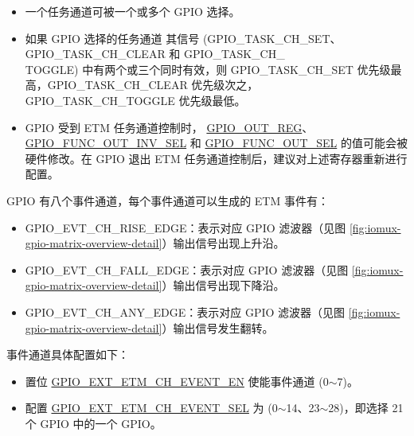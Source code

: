 \documentclass[main\_\_CN.tex]{subfiles}
\begin{document}
\begin{tiplisting}
\vspace{-2em}
\begin{itemize}
\item 一个任务通道可被一个或多个 GPIO 选择。

\item 如果 GPIO 选择的任务通道  其信号 (GPIO\_TASK\_CH\_SET、GPIO\_TASK\_CH\_CLEAR 和 GPIO\_TASK\_CH\_\\TOGGLE) 中有两个或三个同时有效，则 GPIO\_TASK\_CH\_SET 优先级最高，GPIO\_TASK\_CH\_CLEAR 优先级次之，GPIO\_TASK\_CH\_TOGGLE 优先级最低。

\item GPIO 受到 ETM 任务通道控制时， \hyperref[regdesc:GPIOOUTREG]{GPIO\_OUT\_REG}、 \hyperref[fielddesc:GPIOFUNCNOUTINVSEL]{GPIO\_FUNC\_OUT\_INV\_SEL} 和 \hyperref[fielddesc:GPIOFUNCNOUTSEL]{GPIO\_FUNC\_OUT\_SEL} 的值可能会被硬件修改。在 GPIO 退出 ETM 任务通道控制后，建议对上述寄存器重新进行配置。
\end{itemize}
\end{tiplisting}

GPIO 有八个事件通道，每个事件通道可以生成的 ETM 事件有：

\begin{itemize}
    \item GPIO\_EVT\_CH\_RISE\_EDGE：表示对应 GPIO 滤波器（见图 \ref{fig:iomux-gpio-matrix-overview-detail}）输出信号出现上升沿。
    \item GPIO\_EVT\_CH\_FALL\_EDGE：表示对应 GPIO 滤波器（见图 \ref{fig:iomux-gpio-matrix-overview-detail}）输出信号出现下降沿。
    \item GPIO\_EVT\_CH\_ANY\_EDGE：表示对应 GPIO 滤波器（见图 \ref{fig:iomux-gpio-matrix-overview-detail}）输出信号发生翻转。
\end{itemize}

事件通道具体配置如下：

\begin{itemize}
    \item 置位 \hyperref[fielddesc:GPIOEXTETMCH0EVENTEN]{GPIO\_EXT\_ETM\_CH\_EVENT\_EN} 使能事件通道  (0$\sim$7)。
    \item 配置 \hyperref[fielddesc:GPIOEXTETMCH0EVENTSEL]{GPIO\_EXT\_ETM\_CH\_EVENT\_SEL} 为  (0$\sim$14、23$\sim$28)，即选择 21 个 GPIO 中的一个 GPIO。
\end{itemize}
\end{document}

